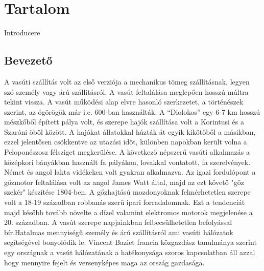 \documentclass[a4paper,12pt]{article}
\begin{document}
\section*{Tartalom}
	\begingroup
	\renewcommand{\section}[2]{}
	\tableofcontents
	\endgroup
	\begingroup
	\newpage
	\listoffigures
	\listoftables
	\lstlistoflistings
	\endgroup
\newpage
\pagestyle{fancy}
\rhead{\slshape \leftmark}
\section{Bevezető}\sectionro{Introducere}
\subsection{Bevezető}
A vasúti szállítás volt az első verziója a mechanikus tömeg szállításnak, legyen szó személy vagy árú szállításról. 
A vasút feltalálása meglepően hosszú múltra tekint vissza. A vasút működési alap elvre hasonló szerkezetet, a történészek szerint, az ógörögök már i.e. 600-ban használták. 
A “Diolokos” egy 6-7 km hosszú mészkőből épített pálya volt, és szerepe hajók szállítása volt a Korintusi és a Szaróni öböl között.\cite{jwdrijvers92} 
A hajókat állatokkal húzták át egyik kikötőből a másikban, ezzel jelentősen csökkentve az utazási időt, különben napokban került volna a Peloponészosz félsziget megkerülése.
A következő népszerű vasúti alkalmazás a középkori bányákban használt fa pályákon, lovakkal vontatott, fa szerelvények. Német és angol lakta vidékeken volt gyakran alkalmazva.
Az igazi fordulópont a gőzmotor feltalálása volt az angol James Watt által, majd az ezt követő "gőz szekér" készítése 1804-ben.
A gőzhajtású mozdonyoknak felmérhetetlen szerepe volt a 18-19 században robbanás szerű ipari forradalomnak. Ezt a tendenciát majd később tovább növelte a dízel valamint elektromos motorok megjelenése a 20. században.
A vasút szerepe napjainkban felbecsülhetetlen befolyással bír.Hatalmas mennyiségű személy és árú szállításról ami vasúti hálózatok segítségével bonyolódik le. 
Vincent Baziet francia közgazdász tanulmánya \cite{vbazil13} szerint egy országnak a vasút hálózatának a hatékonysága szoros kapcsolatban áll azzal hogy mennyire fejelt és versenyképes maga az ország gazdasága.
\end{document}
